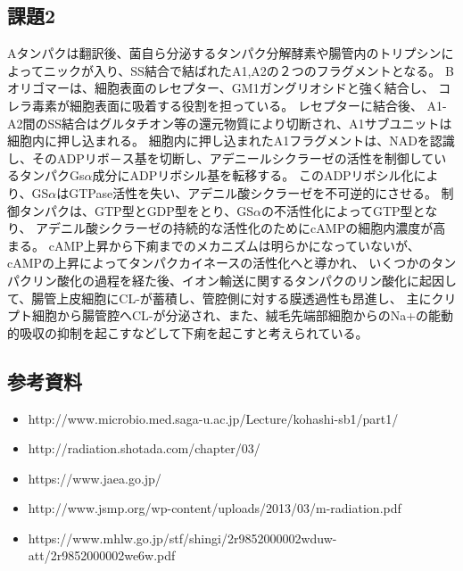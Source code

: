 \documentclass[a4paper,papersize,dvipdfmx]{jsarticle}
\begin{document}
\subsection*{課題2}
Aタンパクは翻訳後、菌自ら分泌するタンパク分解酵素や腸管内のトリプシンによってニックが入り、SS結合で結ばれたA1,A2の２つのフラグメントとなる。
Bオリゴマーは、細胞表面のレセプター、GM1ガングリオシドと強く結合し、 コレラ毒素が細胞表面に吸着する役割を担っている。
レセプターに結合後、 A1-A2間のSS結合はグルタチオン等の還元物質により切断され、A1サブユニットは細胞内に押し込まれる。
細胞内に押し込まれたA1フラグメントは、NADを認識し、そのADPリボ－ス基を切断し、アデニールシクラーゼの活性を制御しているタンパクGs$\alpha$成分にADPリボシル基を転移する。
このADPリボシル化により、GS$\alpha$はGTPase活性を失い、アデニル酸シクラーゼを不可逆的にさせる。
制御タンパクは、GTP型とGDP型をとり、GS$\alpha$の不活性化によってGTP型となり、 アデニル酸シクラーゼの持続的な活性化のためにcAMPの細胞内濃度が高まる。
cAMP上昇から下痢までのメカニズムは明らかになっていないが、 cAMPの上昇によってタンパクカイネースの活性化へと導かれ、
いくつかのタンパクリン酸化の過程を経た後、イオン輸送に関するタンパクのリン酸化に起因して、腸管上皮細胞にCL-が蓄積し、管腔側に対する膜透過性も昂進し、
主にクリプト細胞から腸管腔へCL-が分泌され、また、絨毛先端部細胞からのNa+の能動的吸収の抑制を起こすなどして下痢を起こすと考えられている。

\subsection*{参考資料}
\footnotesize
\begin{itemize}
\item http://www.microbio.med.saga-u.ac.jp/Lecture/kohashi-sb1/part1/
\item http://radiation.shotada.com/chapter/03/
\item https://www.jaea.go.jp/
\item http://www.jsmp.org/wp-content/uploads/2013/03/m-radiation.pdf
\item https://www.mhlw.go.jp/stf/shingi/2r9852000002wduw-att/2r9852000002we6w.pdf
\end{itemize}
\end{document}
